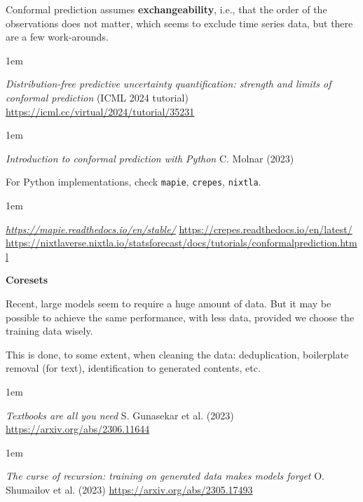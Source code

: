 \documentclass[a5paper]{article}
\let\d\textbf
\newenvironment{reference}{%
  \medskip\goodbreak
  \parskip 0pt
  \raggedright
  \leftskip 1em
  \obeylines
}{\par\medskip\goodbreak}
\def\section#1{\clearpage{\vspace*{0cm}\LARGE\centering\bfseries #1\par\bigskip\bigskip}}
\def\subsection#1{{\par\bigskip\goodbreak\large\bfseries #1\par}}
\begin{document}
Conformal prediction assumes \d{exchangeability}, i.e., that the order of the observations does not matter,
which seems to exclude time series data, but there are a few work-arounds. 

\begin{reference}
  \emph{Distribution-free predictive uncertainty quantification: strength and limits of conformal prediction}
  (ICML 2024 tutorial)
  \url{https://icml.cc/virtual/2024/tutorial/35231}
\end{reference}

\begin{reference}
  \emph{Introduction to conformal prediction with Python}
  C. Molnar (2023)
\end{reference}

For Python implementations, check \texttt{mapie}, \texttt{crepes}, \texttt{nixtla}.

\begin{reference}
  \emph{\url{https://mapie.readthedocs.io/en/stable/}}
  \url{https://crepes.readthedocs.io/en/latest/}
  \url{https://nixtlaverse.nixtla.io/statsforecast/docs/tutorials/conformalprediction.html}
\end{reference}

\section{Data-centric machine learning}

\subsection{Coresets}

Recent, large models seem to require a huge amount of data.
But it may be possible to achieve the same performance, with less data,
provided we choose the training data wisely.

This is done, to some extent, when cleaning the data:
deduplication, boilerplate removal (for text), identification to generated contents, etc.

\begin{reference}
  \emph{Textbooks are all you need}
  S. Gunasekar et al. (2023)
  \url{https://arxiv.org/abs/2306.11644}
\end{reference}

\begin{reference}
  \emph{The curse of recursion: training on generated data makes models forget}
  O. Shumailov et al. (2023)
  \url{https://arxiv.org/abs/2305.17493}
\end{reference}
\end{document}
